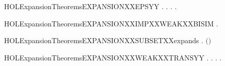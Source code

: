 \newcommand{\HOLExpansionTheoremsEXPANSIONXXEPS}{\UseVerbatim{HOLExpansionTheoremsEXPANSIONXXEPS}}
\begin{SaveVerbatim}{HOLExpansionTheoremsEXPANSIONXXEPSYY}
\HOLTokenTurnstile{} \HOLSymConst{\HOLTokenForall{}}.
         \HOLSymConst{\HOLTokenImp{}}
       \HOLSymConst{\HOLTokenForall{}} .
              \HOLSymConst{\HOLTokenImp{}} \HOLSymConst{\HOLTokenForall{}}.    \HOLSymConst{\HOLTokenImp{}} \HOLSymConst{\HOLTokenExists{}}.    \HOLSymConst{\HOLTokenConj{}}   
\end{SaveVerbatim}
\newcommand{\HOLExpansionTheoremsEXPANSIONXXEPSYY}{\UseVerbatim{HOLExpansionTheoremsEXPANSIONXXEPSYY}}
\begin{SaveVerbatim}{HOLExpansionTheoremsEXPANSIONXXIMPXXWEAKXXBISIM}
\HOLTokenTurnstile{} \HOLSymConst{\HOLTokenForall{}}.   \HOLSymConst{\HOLTokenImp{}}  
\end{SaveVerbatim}
\newcommand{\HOLExpansionTheoremsEXPANSIONXXIMPXXWEAKXXBISIM}{\UseVerbatim{HOLExpansionTheoremsEXPANSIONXXIMPXXWEAKXXBISIM}}
\begin{SaveVerbatim}{HOLExpansionTheoremsEXPANSIONXXSUBSETXXexpands}
\HOLTokenTurnstile{} \HOLSymConst{\HOLTokenForall{}}.   \HOLSymConst{\HOLTokenImp{}}   \ensuremath{(}\ensuremath{)}
\end{SaveVerbatim}
\newcommand{\HOLExpansionTheoremsEXPANSIONXXSUBSETXXexpands}{\UseVerbatim{HOLExpansionTheoremsEXPANSIONXXSUBSETXXexpands}}
\begin{SaveVerbatim}{HOLExpansionTheoremsEXPANSIONXXWEAKXXTRANSYY}
\HOLTokenTurnstile{} \HOLSymConst{\HOLTokenForall{}}.
         \HOLSymConst{\HOLTokenImp{}}
       \HOLSymConst{\HOLTokenForall{}} .
              \HOLSymConst{\HOLTokenImp{}}
           \HOLSymConst{\HOLTokenForall{}} .  \HOLTokenWeakTransBegin{}\HOLTokenWeakTransEnd {} \HOLSymConst{\HOLTokenImp{}} \HOLSymConst{\HOLTokenExists{}}.  \HOLTokenWeakTransBegin{}\HOLTokenWeakTransEnd {} \HOLSymConst{\HOLTokenConj{}}   
\end{SaveVerbatim}
